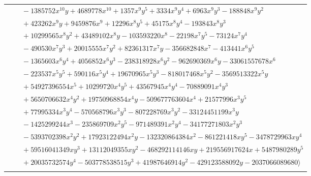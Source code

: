 \documentclass[11pt]{article}
\begin{document}
\begin{longtable}{@{}ll@{}}
 & $\quad -1385752x^{10}y+4689778x^{10}+1357x^{9}y^{5}+3334x^{9}y^{4}+6963x^{9}y^{3}-188848x^{9}y^{2}$\\
 & $\quad +423262x^{9}y+9459876x^{9}+12296x^{8}y^{5}+45175x^{8}y^{4}-193843x^{8}y^{3}$\\
 & $\quad +10299565x^{8}y^{2}+43489102x^{8}y-103593220x^{8}-22198x^{7}y^{5}-73124x^{7}y^{4}$\\
 & $\quad -490530x^{7}y^{3}+20015555x^{7}y^{2}+82361317x^{7}y-356682848x^{7}-413441x^{6}y^{5}$\\
 & $\quad -1365603x^{6}y^{4}+4056852x^{6}y^{3}-238318928x^{6}y^{2}-962690369x^{6}y-33061557678x^{6}$\\
 & $\quad -223537x^{5}y^{5}+590116x^{5}y^{4}+19670965x^{5}y^{3}-818017468x^{5}y^{2}-3569513322x^{5}y$\\
 & $\quad +54927396554x^{5}+10299720x^{4}y^{5}+43567945x^{4}y^{4}-70889091x^{4}y^{3}$\\
 & $\quad +5650706632x^{4}y^{2}+19750968854x^{4}y-509677763604x^{4}+21577996x^{3}y^{5}$\\
 & $\quad +77995334x^{3}y^{4}-570568796x^{3}y^{3}-807228769x^{3}y^{2}-33124451199x^{3}y$\\
 & $\quad -1425299244x^{3}-235869709x^{2}y^{5}-971489391x^{2}y^{4}-34177271803x^{2}y^{3}$\\
 & $\quad -5393702398x^{2}y^{2}+17923122494x^{2}y-132320864384x^{2}-861221418xy^{5}-3478729963xy^{4}$\\
 & $\quad +59516041349xy^{3}+13112049355xy^{2}-468292114146xy+219556917624x+5487980289y^{5}$\\
 & $\quad +20035732574y^{4}-503778538515y^{3}+41987646914y^{2}-429123588092y-2037066089680\rangle$\\
\addlinespace[2pt]
\end{longtable}
\endgroup
\end{document}
